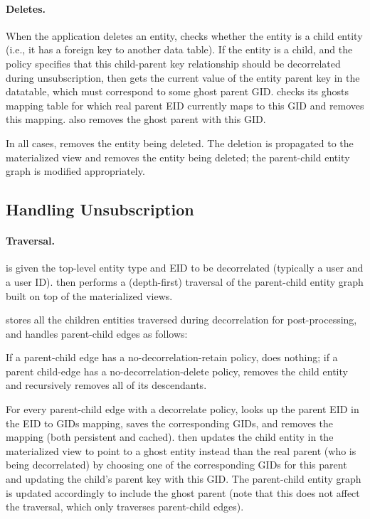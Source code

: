 \paragraph{Deletes.}
When the application deletes an entity, \sys checks whether
the entity is a child entity (i.e., it has a foreign key to another data table). 
If the entity is a child, and the policy specifies that this child-parent key
relationship should be decorrelated during unsubscription, then \sys gets the current value of the
entity parent key in the datatable, which must correspond to some ghost parent GID.
\sys checks its ghosts mapping table for which real parent EID currently maps to this GID and removes
this mapping. \sys also removes the ghost parent with this GID.

In all cases, \sys removes the entity being deleted.
The deletion is propagated to the materialized view and removes the entity being deleted; the
parent-child entity graph is modified appropriately.

\subsection{Handling Unsubscription}
\paragraph{Traversal.}
\sys is given the top-level entity type and EID to be decorrelated (typically a user and a user ID).
\sys then performs a (depth-first) traversal of the parent-child entity graph built on top of the materialized
views. 

\sys stores all the children entities traversed during decorrelation for post-processing, and
handles parent-child edges as follows:

If a parent-child edge has a no-decorrelation-retain policy, \sys does nothing; if a parent child-edge has a
no-decorrelation-delete policy, \sys removes the child entity and recursively removes all of its
descendants. 

For every parent-child edge with a decorrelate policy, \sys looks up the parent EID in the
EID to GIDs mapping, saves the corresponding GIDs, and removes the mapping (both persistent and
cached).
\sys then updates the child entity in the materialized view to point to a ghost entity instead
than the real parent (who is being decorrelated) by choosing one of the corresponding GIDs for this
parent and updating the child's parent key with this GID.  The parent-child entity graph is updated
accordingly to include the ghost parent (note that this does not affect the traversal, which only
traverses parent-child edges).

